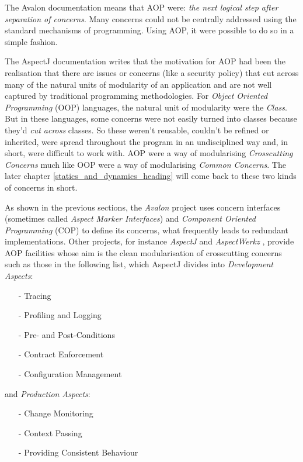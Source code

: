 The Avalon documentation \cite{avalon} means that AOP were: \textit{the next
logical step after separation of concerns}. Many concerns could not be
centrally addressed using the standard mechanisms of programming. Using AOP, it
were possible to do so in a simple fashion.

The AspectJ documentation \cite{aspectj} writes that the motivation for AOP had
been the realisation that there are issues or concerns (like a security policy)
that cut across many of the natural units of modularity of an application and
are not well captured by traditional programming methodologies. For
\emph{Object Oriented Programming} (OOP) languages, the natural unit of
modularity were the \emph{Class}. But in these languages, some concerns were
not easily turned into classes because they'd \emph{cut across} classes. So
these weren't reusable, couldn't be refined or inherited, were spread
throughout the program in an undisciplined way and, in short, were difficult to
work with. AOP were a way of modularising \emph{Crosscutting Concerns} much
like OOP were a way of modularising \emph{Common Concerns}. The later chapter
\ref{statics_and_dynamics_heading} will come back to these two kinds of
concerns in short.

As shown in the previous sections, the \emph{Avalon} project \cite{avalon} uses
concern interfaces (sometimes called \emph{Aspect Marker Interfaces}) and
\emph{Component Oriented Programming} (COP) to define its concerns, what
frequently leads to redundant implementations. Other projects, for instance
\emph{AspectJ} \cite{aspectj} and \emph{AspectWerkz} \cite{aspectwerkz},
provide AOP facilities whose aim is the clean modularisation of crosscutting
concerns such as those in the following list, which AspectJ divides into
\emph{Development Aspects}:

\begin{itemize}
    \item[-] Tracing
    \item[-] Profiling and Logging
    \item[-] Pre- and Post-Conditions
    \item[-] Contract Enforcement
    \item[-] Configuration Management
\end{itemize}

and \emph{Production Aspects}:

\begin{itemize}
    \item[-] Change Monitoring
    \item[-] Context Passing
    \item[-] Providing Consistent Behaviour
\end{itemize}

